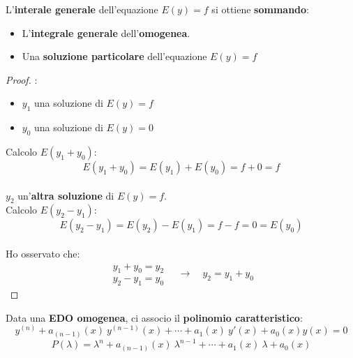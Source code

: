 \documentclass[a4paper, oneside]{article}
\begin{document}
    \begin{theorem}
        L'\textbf{interale generale} dell'equazione $E(y) = f$ si ottiene \textbf{sommando}:
        \begin{itemize}
            \item L'\textbf{integrale generale} dell'\textbf{omogenea}. 
            \item Una \textbf{soluzione particolare} dell'equazione $E(y) = f$
        \end{itemize}

        \begin{proof}
            :
            \begin{itemize}
                \item $y_1$ una soluzione di $E(y) = f$
                \item $y_0$ una soluzione di $E(y) = 0$
            \end{itemize}
            Calcolo $E(y_1+y_0)$:
            \[E(y_1+y_0) = E(y_1) + E(y_0) = f+0=f\]\\
             $y_2$ un'\textbf{altra soluzione} di $E(y) = f$.\\
            Calcolo $E(y_2-y_1)$:
            \[E(y_2-y_1) = E(y_2) - E(y_1) = f-f = 0 = E(y_0)\]\\
            Ho osservato che:
            \[\begin{matrix}
                y_1+y_0=y_2\\
                y_2-y_1=y_0
            \end{matrix} \quad\longrightarrow\quad y_2=y_1+y_0\]
        \end{proof}
    \end{theorem}

    \begin{definition}
        Data una \textbf{EDO omogenea}, ci associo il \textbf{polinomio caratteristico}:
        \[y^{(n)} + a_{(n-1)}(x) \ y^{(n-1)}(x) + \cdots + a_1(x) \ y'(x) + a_0(x)y(x) = 0\]
        \[P(\lambda) = \lambda^n + a_{(n-1)}(x) \ \lambda^{n-1} + \cdots + a_1(x) \ \lambda + a_0(x)\]
    \end{definition}
\end{document}
